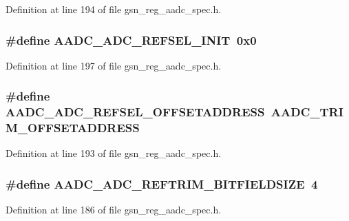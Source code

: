 Definition at line 194 of file gsn\_\-reg\_\-aadc\_\-spec.h.

\hypertarget{a00543_a68323250853cdd1079e24e3b1390aabd}{
\subsubsection[{AADC\_\-ADC\_\-REFSEL\_\-INIT}]{\setlength{\rightskip}{0pt plus 5cm}\#define AADC\_\-ADC\_\-REFSEL\_\-INIT~0x0}}
\label{a00543_a68323250853cdd1079e24e3b1390aabd}


Definition at line 197 of file gsn\_\-reg\_\-aadc\_\-spec.h.

\hypertarget{a00543_a28772e4f158a5b92d4db84418b883ab3}{
\subsubsection[{AADC\_\-ADC\_\-REFSEL\_\-OFFSETADDRESS}]{\setlength{\rightskip}{0pt plus 5cm}\#define AADC\_\-ADC\_\-REFSEL\_\-OFFSETADDRESS~AADC\_\-TRIM\_\-OFFSETADDRESS}}
\label{a00543_a28772e4f158a5b92d4db84418b883ab3}


Definition at line 193 of file gsn\_\-reg\_\-aadc\_\-spec.h.

\hypertarget{a00543_aeda149fe753ec8a1ce7166e90b490b37}{
\subsubsection[{AADC\_\-ADC\_\-REFTRIM\_\-BITFIELDSIZE}]{\setlength{\rightskip}{0pt plus 5cm}\#define AADC\_\-ADC\_\-REFTRIM\_\-BITFIELDSIZE~4}}
\label{a00543_aeda149fe753ec8a1ce7166e90b490b37}


Definition at line 186 of file gsn\_\-reg\_\-aadc\_\-spec.h.

